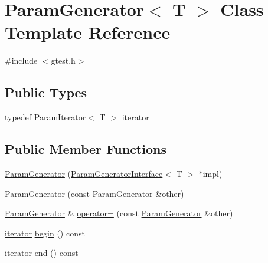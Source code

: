 \hypertarget{classtesting_1_1internal_1_1ParamGenerator}{\section{\-Param\-Generator$<$ \-T $>$ \-Class \-Template \-Reference}
\label{db/d6b/classtesting_1_1internal_1_1ParamGenerator}
}


{\ttfamily \#include $<$gtest.\-h$>$}

\subsection*{\-Public \-Types}
\begin{DoxyCompactItemize}
\item 
typedef \hyperlink{classtesting_1_1internal_1_1ParamIterator}{\-Param\-Iterator}$<$ \-T $>$ \hyperlink{classtesting_1_1internal_1_1ParamGenerator_a6b7c61f075b1727c4b8fbc849b7d9a95}{iterator}
\end{DoxyCompactItemize}
\subsection*{\-Public \-Member \-Functions}
\begin{DoxyCompactItemize}
\item 
\hyperlink{classtesting_1_1internal_1_1ParamGenerator_a5faef39fe07e2f665e1af74fb27d1899}{\-Param\-Generator} (\hyperlink{classtesting_1_1internal_1_1ParamGeneratorInterface}{\-Param\-Generator\-Interface}$<$ \-T $>$ $\ast$impl)
\item 
\hyperlink{classtesting_1_1internal_1_1ParamGenerator_a5b8860c4c97491d5dc73997b1dbea17d}{\-Param\-Generator} (const \hyperlink{classtesting_1_1internal_1_1ParamGenerator}{\-Param\-Generator} \&other)
\item 
\hyperlink{classtesting_1_1internal_1_1ParamGenerator}{\-Param\-Generator} \& \hyperlink{classtesting_1_1internal_1_1ParamGenerator_abb781ef5a7f7b199c37fbc010f1c0e88}{operator=} (const \hyperlink{classtesting_1_1internal_1_1ParamGenerator}{\-Param\-Generator} \&other)
\item 
\hyperlink{classtesting_1_1internal_1_1ParamGenerator_a6b7c61f075b1727c4b8fbc849b7d9a95}{iterator} \hyperlink{classtesting_1_1internal_1_1ParamGenerator_a2fcbf5359798ec294d009f286fd802e6}{begin} () const 
\item 
\hyperlink{classtesting_1_1internal_1_1ParamGenerator_a6b7c61f075b1727c4b8fbc849b7d9a95}{iterator} \hyperlink{classtesting_1_1internal_1_1ParamGenerator_ac0742d15ef3d775dfe617aab68aaadaa}{end} () const 
\end{DoxyCompactItemize}
